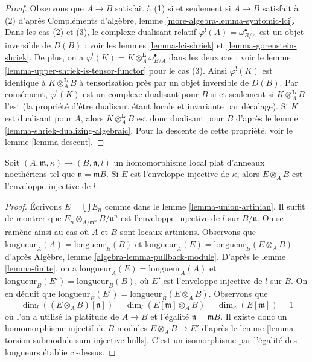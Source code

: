 \begin{proof}
Observons que $A \to B$ satisfait à (1) si et seulement si $A \to B$ satisfait à (2)
d'après Compléments d'algèbre, lemme \ref{more-algebra-lemma-syntomic-lci}.
Dans les cas (2) et (3), le complexe dualisant relatif $\varphi^!(A) = \omega_{B/A}^\bullet$
est un objet inversible de $D(B)$ ; voir les lemmes \ref{lemma-lci-shriek} et \ref{lemma-gorenstein-shriek}.
De plus, on a $\varphi^!(K) = K \otimes_A^\mathbf{L} \omega_{B/A}^\bullet$ dans les deux cas ; voir le lemme \ref{lemma-upper-shriek-is-tensor-functor} pour le cas (3).
Ainsi $\varphi^!(K)$ est identique à $K \otimes_A^\mathbf{L} B$ à tensorisation près
par un objet inversible de $D(B)$.
Par conséquent, $\varphi^!(K)$ est un complexe dualisant pour $B$
si et seulement si $K \otimes_A^\mathbf{L} B$ l'est
(la propriété d'être dualisant étant locale et invariante par décalage).
Si $K$ est dualisant pour $A$, alors $K \otimes_A^\mathbf{L} B$ est donc dualisant
pour $B$ d'après le lemme \ref{lemma-shriek-dualizing-algebraic}.
Pour la descente de cette propriété, voir le lemme \ref{lemma-descent}.
\end{proof}

\begin{lemma}
\label{lemma-injective-hull-goes-up}
Soit $(A, \mathfrak m, \kappa) \to (B, \mathfrak n, l)$ un homomorphisme local plat d'anneaux noethériens tel que $\mathfrak n = \mathfrak m B$.
Si $E$ est l'enveloppe injective de $\kappa$,
alors $E \otimes_A B$ est l'enveloppe injective de $l$.
\end{lemma}

\begin{proof}
Écrivons $E = \bigcup E_n$ comme dans le lemme \ref{lemma-union-artinian}.
Il suffit de montrer que $E_n \otimes_{A/\mathfrak m^n} B/\mathfrak n^n$ est l'enveloppe injective de $l$ sur $B/\mathfrak n$.
On se ramène ainsi au cas où $A$ et $B$ sont locaux artiniens.
Observons que $\text{longueur}_A(A) = \text{longueur}_B(B)$ et $\text{longueur}_A(E) = \text{longueur}_B(E \otimes_A B)$ d'après Algèbre, lemme \ref{algebra-lemma-pullback-module}.
D'après le lemme \ref{lemma-finite}, on a $\text{longueur}_A(E) = \text{longueur}_A(A)$ et $\text{longueur}_B(E') = \text{longueur}_B(B)$,
où $E'$ est l'enveloppe injective de $l$ sur $B$.
On en déduit que $\text{longueur}_B(E') = \text{longueur}_B(E \otimes_A B)$. Observons que
$$
\dim_l((E \otimes_A B)[\mathfrak n]) =
\dim_l(E[\mathfrak m] \otimes_A B) =
\dim_\kappa(E[\mathfrak m]) = 1
$$
où l'on a utilisé la platitude de $A \to B$ et l'égalité $\mathfrak n = \mathfrak mB$.
Il existe donc un homomorphisme injectif de $B$-modules $E \otimes_A B \to E'$
d'après le lemme \ref{lemma-torsion-submodule-sum-injective-hulls}.
C'est un isomorphisme par l'égalité des longueurs établie ci-dessus.
\end{proof}

